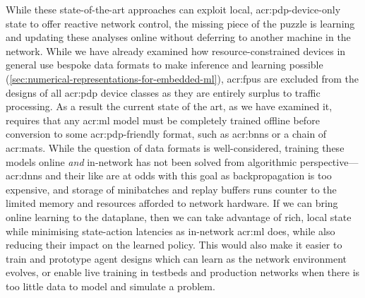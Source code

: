 While these state-of-the-art approaches can exploit local, \gls{acr:pdp}-device-only state to offer reactive network control, the missing piece of the puzzle is learning and updating these analyses online without deferring to another machine in the network.
While we have already examined how resource-constrained devices in general use bespoke data formats to make inference and learning possible (\cref{sec:numerical-representations-for-embedded-ml}), \glspl{acr:fpu} are excluded from the designs of all \gls{acr:pdp} device classes as they are entirely surplus to traffic processing.
As a result the current state of the art, as we have examined it, requires that any \gls{acr:ml} model must be completely trained offline before conversion to some \gls{acr:pdp}-friendly format, such as \glspl{acr:bnn} or a chain of \glspl{acr:mat}.
While the question of data formats is well-considered, training these models online \emph{and} in-network has not been solved from algorithmic perspective---\glspl{acr:dnn} and their like are at odds with this goal as backpropagation is too expensive, and storage of minibatches and replay buffers runs counter to the limited memory and resources afforded to network hardware.
If we can bring online learning to the dataplane, then we can take advantage of rich, local state while minimising state-action latencies as in-network \gls{acr:ml} does, while also reducing their impact on the learned policy.
This would also make it easier to train and prototype agent designs which can learn as the network environment evolves, or enable live training in testbeds and production networks when there is too little data to model and simulate a problem.

